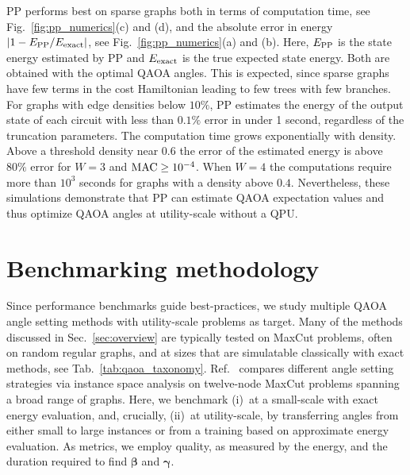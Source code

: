 \documentclass[twocolumn,
english,
aps,
pra,
10pt,
longbibliography,
superscriptaddress,
amsmath,
amssymb,
floatfix
]{revtex4-2}
\begin{document}
PP performs best on sparse graphs both in terms of computation time, see Fig.~\ref{fig:pp_numerics}(c) and (d), and the absolute error in energy $\left|1 - E_{\rm PP}/E_{\rm exact}\right|$, see Fig.~\ref{fig:pp_numerics}(a) and (b).
Here, $E_{\rm PP}$ is the state energy estimated by PP and $E_{\rm exact}$ is the true expected state energy.
Both are obtained with the optimal QAOA angles.
This is expected, since sparse graphs have few terms in the cost Hamiltonian leading to few trees with few branches.
For graphs with edge densities below $10\%$, PP estimates the energy of the output state of each circuit with less than $0.1\%$ error in under 1 second, regardless of the truncation parameters. 
The computation time grows exponentially with density. 
Above a threshold density near $0.6$ the error of the estimated energy is above $80\%$ error for $W = 3$ and $\rm MAC \geq 10^{-4}$. 
When $W = 4$ the computations require more than $10^3$ seconds for graphs with a density above $0.4$. 
Nevertheless, these simulations demonstrate that PP can estimate QAOA expectation values and thus optimize QAOA angles at utility-scale without a QPU.


\section{Benchmarking methodology\label{sec:bench_method}}

Since performance benchmarks guide best-practices, we study multiple QAOA angle setting methods with utility-scale problems as target.
Many of the methods discussed in Sec.~\ref{sec:overview} are typically tested on MaxCut problems, often on random regular graphs, and at sizes that are simulatable classically with exact methods, see Tab.~\ref{tab:qaoa_taxonomy}.
Ref.~\cite{Katial2025} compares different angle setting strategies via instance space analysis on twelve-node MaxCut problems spanning a broad range of graphs.
Here, we benchmark (i)~at a small-scale with exact energy evaluation, and, crucially, (ii)~at utility-scale, by transferring angles from either small to large instances or from a training based on approximate energy evaluation.
As metrics, we employ quality, as measured by the energy, and the duration required to find $\boldsymbol{\beta}$ and $\boldsymbol{\gamma}$.
\end{document}
